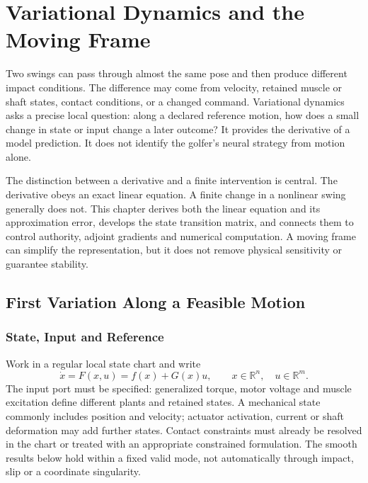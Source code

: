 \chapter{Variational Dynamics and the Moving Frame}
\label{ch:variational}

Two swings can pass through almost the same pose and then produce different impact conditions. The difference may come from velocity, retained muscle or shaft states, contact conditions, or a changed command. Variational dynamics asks a precise local question: along a declared reference motion, how does a small change in state or input change a later outcome? It provides the derivative of a model prediction. It does not identify the golfer's neural strategy from motion alone.

The distinction between a derivative and a finite intervention is central. The derivative obeys an exact linear equation. A finite change in a nonlinear swing generally does not. This chapter derives both the linear equation and its approximation error, develops the state transition matrix, and connects them to control authority, adjoint gradients and numerical computation. A moving frame can simplify the representation, but it does not remove physical sensitivity or guarantee stability.

\section{First Variation Along a Feasible Motion}

\subsection{State, Input and Reference}

Work in a regular local state chart and write
\begin{equation}
\dot x=F(x,u)=f(x)+G(x)u,
\qquad x\in\mathbb R^n,\quad u\in\mathbb R^m.
\label{eq:ch2:affine}
\end{equation}
The input port must be specified: generalized torque, motor voltage and muscle excitation define different plants and retained states. A mechanical state commonly includes position and velocity; actuator activation, current or shaft deformation may add further states. Contact constraints must already be resolved in the chart or treated with an appropriate constrained formulation. The smooth results below hold within a fixed valid mode, not automatically through impact, slip or a coordinate singularity.

